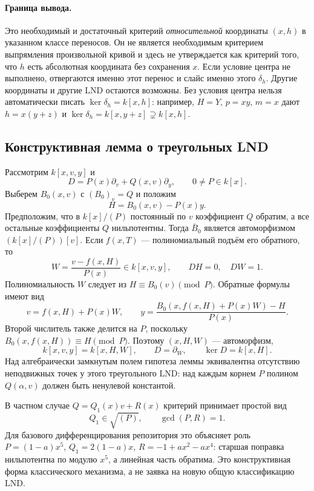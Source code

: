 \paragraph{Граница вывода.}
Это необходимый и достаточный критерий \emph{относительной} координаты
$(x,h)$ в указанном классе переносов. Он не является необходимым критерием
выпрямления произвольной кривой и здесь не утверждается как критерий того,
что $h$ есть абсолютная координата без сохранения $x$.
Если условие центра не выполнено, отвергаются именно этот перенос и слайс
именно этого $\delta_h$. Другие координаты и другие LND остаются возможны.
Без условия центра нельзя автоматически писать $\ker\delta_h=k[x,h]$:
например, $H=Y$, $p=xy$, $m=x$ дают $h=x(y+z)$ и
$\ker\delta_h=k[x,y+z]\supsetneq k[x,h]$.

\subsection{Конструктивная лемма о треугольных LND}

Рассмотрим $k[x,v,y]$ и
\[
 D=P(x)\partial_v+Q(x,v)\partial_y,\qquad 0\ne P\in k[x].
\]
Выберем $B_0(x,v)$ с $(B_0)_v=Q$ и положим
\[
 H=B_0(x,v)-P(x)y.
\]
Предположим, что в $k[x]/(P)$ постоянный по $v$ коэффициент $Q$ обратим,
а все остальные коэффициенты $Q$ нильпотентны. Тогда
$\bar B_0$ является автоморфизмом $(k[x]/(P))[v]$. Если $f(x,T)$ ---
полиномиальный подъём его обратного, то
\[
 W=\frac{v-f(x,H)}{P(x)}\in k[x,v,y],\qquad DH=0,\quad DW=1.
\]
Полиномиальность $W$ следует из $H\equiv B_0(v)\pmod P$. Обратные
формулы имеют вид
\[
 v=f(x,H)+P(x)W,\qquad
 y=\frac{B_0(x,f(x,H)+P(x)W)-H}{P(x)}.
\]
Второй числитель также делится на $P$, поскольку
$B_0(x,f(x,H))\equiv H\pmod P$. Поэтому $(x,H,W)$ --- автоморфизм,
\[
 k[x,v,y]=k[x,H,W],\qquad D=\partial_W,
 \qquad \ker D=k[x,H].
\]
Над алгебраически замкнутым полем гипотеза леммы эквивалентна отсутствию
неподвижных точек у этого треугольного LND: над каждым корнем $P$
полином $Q(\alpha,v)$ должен быть ненулевой константой.

В частном случае $Q=Q_1(x)v+R(x)$ критерий принимает простой вид
\[
 Q_1\in\sqrt{(P)},\qquad \gcd(P,R)=1.
\]
Для базового дифференцирования репозитория это объясняет роль
$P=(1-a)x^5$, $Q_1=2(1-a)x$, $R=-1+ax^2-ax^4$: старшая поправка
нильпотентна по модулю $x^5$, а линейная часть обратима. Это конструктивная
форма классического механизма, а не заявка на новую общую классификацию LND.


